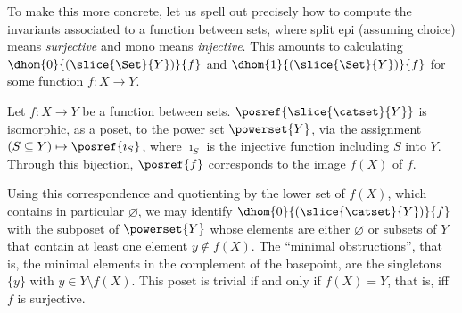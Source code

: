 To make this more concrete, let us spell out precisely how to compute the invariants associated to a function between sets, where split epi (assuming choice) means \emph{surjective} and mono means \emph{injective}.
This amounts to calculating $\dhom{0}{(\slice{\Set}{Y})}{f}$ and $\dhom{1}{(\slice{\Set}{Y})}{f}$ for some function $f\colon X \to Y$. 
%
%
\begin{proposition}\label{prop: dhom0 for set/y}
    Let $f\colon X \to Y$ be a function between sets. $\posref{\slice{\catset}{Y}}$ is isomorphic, as a poset, to the power set $\powerset{Y}$, via the assignment $(S \subseteq Y) \mapsto \posref{\imath_S}$, where $\imath_S$ is the injective function including $S$ into $Y$.
    Through this bijection, $\posref{f}$ corresponds to the image $f(X)$ of $f$.
\end{proposition}
%
Using this correspondence and quotienting by the lower set of $f(X)$, which contains in particular $\varnothing$, we may identify $\dhom{0}{(\slice{\catset}{Y})}{f}$ with the subposet of $\powerset{Y}$ whose elements are either $\varnothing$ or subsets of $Y$ that contain at least one element $y \notin f(X)$.
The ``minimal obstructions'', that is, the minimal elements in the complement of the basepoint, are the singletons $\{y\}$ with $y \in Y \setminus f(X)$.
This poset is trivial if and only if $f(X) = Y$, that is, iff $f$ is surjective.
%
%
